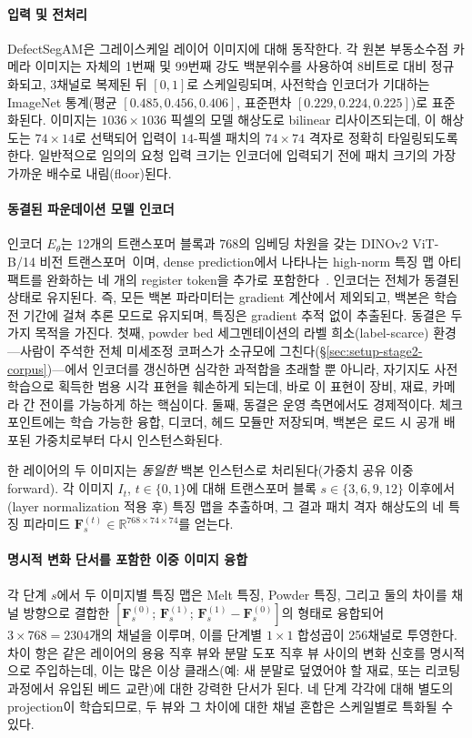 \paragraph{입력 및 전처리}
DefectSegAM은 그레이스케일 레이어 이미지에 대해 동작한다. 각 원본
부동소수점 카메라 이미지는 자체의 1번째 및 99번째 강도 백분위수를
사용하여 8비트로 대비 정규화되고, 3채널로 복제된 뒤 $[0,1]$로
스케일링되며, 사전학습 인코더가 기대하는 ImageNet 통계(평균
$[0.485, 0.456, 0.406]$, 표준편차 $[0.229, 0.224, 0.225]$)로
표준화된다. 이미지는 $1036 \times 1036$ 픽셀의 모델 해상도로 bilinear
리사이즈되는데, 이 해상도는 $74 \times 14$로 선택되어 입력이
$14$-픽셀 패치의 $74 \times 74$ 격자로 정확히 타일링되도록 한다.
일반적으로 임의의 요청 입력 크기는 인코더에 입력되기 전에 패치 크기의
가장 가까운 배수로 내림(floor)된다.

\paragraph{동결된 파운데이션 모델 인코더}
인코더 $E_{\theta}$는 12개의 트랜스포머 블록과 768의 임베딩 차원을
갖는 DINOv2 ViT-B/14 비전 트랜스포머~\cite{Oquab2024DINOv2,Dosovitskiy2021ViT}이며, dense prediction에서
나타나는 high-norm 특징 맵 아티팩트를 완화하는 네 개의 register
token을 추가로 포함한다~\cite{Darcet2024Registers}. 인코더는 전체가
동결된 상태로 유지된다. 즉, 모든 백본 파라미터는 gradient 계산에서
제외되고, 백본은 학습 전 기간에 걸쳐 추론 모드로 유지되며, 특징은
gradient 추적 없이 추출된다. 동결은 두 가지 목적을 가진다. 첫째,
powder bed 세그멘테이션의 라벨 희소(label-scarce) 환경---사람이 주석한
전체 미세조정 코퍼스가 소규모에
그친다(\S\ref{sec:setup-stage2-corpus})---에서 인코더를
갱신하면 심각한 과적합을 초래할 뿐 아니라, 자기지도 사전학습으로
획득한 범용 시각 표현을 훼손하게 되는데, 바로 이 표현이 장비, 재료,
카메라 간 전이를 가능하게 하는 핵심이다. 둘째, 동결은 운영 측면에서도
경제적이다. 체크포인트에는 학습 가능한 융합, 디코더, 헤드 모듈만
저장되며, 백본은 로드 시 공개 배포된 가중치로부터 다시
인스턴스화된다.

한 레이어의 두 이미지는 \emph{동일한} 백본 인스턴스로 처리된다(가중치
공유 이중 forward). 각 이미지 $I_t$, $t \in \{0, 1\}$에 대해
트랜스포머 블록 $s \in \{3, 6, 9, 12\}$ 이후에서(layer normalization
적용 후) 특징 맵을 추출하며, 그 결과 패치 격자 해상도의 네 특징
피라미드 $\mathbf{F}^{(t)}_s \in \mathbb{R}^{768 \times 74 \times 74}$를
얻는다.

\paragraph{명시적 변화 단서를 포함한 이중 이미지 융합}
각 단계 $s$에서 두 이미지별 특징 맵은 Melt 특징, Powder 특징, 그리고
둘의 차이를 채널 방향으로 결합한
$[\mathbf{F}^{(0)}_s;\, \mathbf{F}^{(1)}_s;\,
\mathbf{F}^{(1)}_s - \mathbf{F}^{(0)}_s]$의 형태로 융합되어
$3 \times 768 = 2304$개의 채널을 이루며, 이를 단계별 $1 \times 1$
합성곱이 256채널로 투영한다. 차이 항은 같은 레이어의 용융 직후 뷰와
분말 도포 직후 뷰 사이의 변화 신호를 명시적으로 주입하는데, 이는 많은
이상 클래스(예: 새 분말로 덮였어야 할 재료, 또는 리코팅 과정에서
유입된 베드 교란)에 대한 강력한 단서가 된다. 네 단계 각각에 대해
별도의 projection이 학습되므로, 두 뷰와 그 차이에 대한 채널 혼합은
스케일별로 특화될 수 있다.

